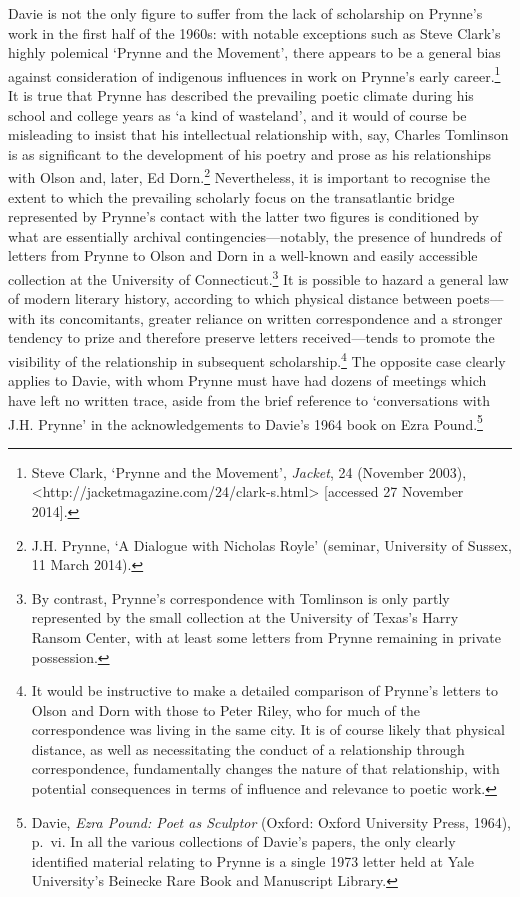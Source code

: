 \documentclass[]{article}
\begin{document}
Davie is not the only figure to suffer from the lack of scholarship on
Prynne's work in the first half of the 1960s: with notable exceptions
such as Steve Clark's highly polemical `Prynne and the Movement', there
appears to be a general bias against consideration of indigenous
influences in work on Prynne's early career.\footnote{Steve Clark,
  `Prynne and the Movement', \emph{Jacket}, 24 (November 2003),
  \textless{}http://jacketmagazine.com/24/clark-s.html\textgreater{}
  {[}accessed 27 November 2014{]}.} It is true that Prynne has described
the prevailing poetic climate during his school and college years as `a
kind of wasteland', and it would of course be misleading to insist that
his intellectual relationship with, say, Charles Tomlinson is as
significant to the development of his poetry and prose as his
relationships with Olson and, later, Ed Dorn.\footnote{J.H. Prynne, `A
  Dialogue with Nicholas Royle' (seminar, University of Sussex, 11 March
  2014).} Nevertheless, it is important to recognise the extent to which
the prevailing scholarly focus on the transatlantic bridge represented
by Prynne's contact with the latter two figures is conditioned by what
are essentially archival contingencies---notably, the presence of
hundreds of letters from Prynne to Olson and Dorn in a well-known and
easily accessible collection at the University of Connecticut.\footnote{By
  contrast, Prynne's correspondence with Tomlinson is only partly
  represented by the small collection at the University of Texas's Harry
  Ransom Center, with at least some letters from Prynne remaining in
  private possession.} It is possible to hazard a general law of modern
literary history, according to which physical distance between
poets---with its concomitants, greater reliance on written
correspondence and a stronger tendency to prize and therefore preserve
letters received---tends to promote the visibility of the relationship
in subsequent scholarship.\footnote{It would be instructive to make a
  detailed comparison of Prynne's letters to Olson and Dorn with those
  to Peter Riley, who for much of the correspondence was living in the
  same city. It is of course likely that physical distance, as well as
  necessitating the conduct of a relationship through correspondence,
  fundamentally changes the nature of that relationship, with potential
  consequences in terms of influence and relevance to poetic work.} The
opposite case clearly applies to Davie, with whom Prynne must have had
dozens of meetings which have left no written trace, aside from the
brief reference to `conversations with J.H. Prynne' in the
acknowledgements to Davie's 1964 book on Ezra Pound.\footnote{Davie,
  \emph{Ezra Pound: Poet as Sculptor} (Oxford: Oxford University Press,
  1964), p.~vi. In all the various collections of Davie's papers, the
  only clearly identified material relating to Prynne is a single 1973
  letter held at Yale University's Beinecke Rare Book and Manuscript
  Library.}
\end{document}

